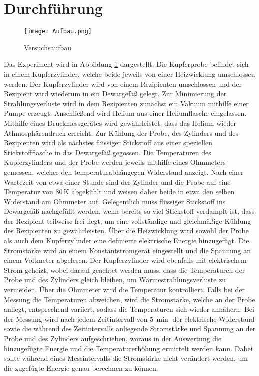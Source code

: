 \section{Durchführung}
\label{sec:Durchführung}
\begin{figure}
  \texttt{[image: Aufbau.png]}
  \caption{Versuchsaufbau\cite{V47}}
    \label{fig:Aufbau}
\end{figure}
Das Experiment wird in Abbildung \ref{fig:Aufbau} dargestellt.
Die Kupferprobe befindet sich in einem Kupferzylinder, welche beide
jeweils von einer Heizwicklung umschlossen werden.
Der Kupferzylinder wird von einem Rezipienten umschlossen
und der Rezipient wird wiederum in ein Dewargefäß gelegt.
Zur Minimierung der Strahlungsverluste wird in dem
Rezipienten zunächst ein Vakuum mithilfe einer Pumpe erzeugt.
Anschließend wird Helium aus einer Heliumflasche eingelassen.
Mithilfe eines Druckmessgerätes wird gewährleistet, dass das Helium wieder Athmosphärendruck erreicht.
Zur Kühlung der Probe, des Zylinders und des Rezipienten wird als nächstes flüssiger Stickstoff
aus einer speziellen Stickstoffflasche in das Dewargefäß gegossen.
Die Temperaturen des Kupferzylinders und der Probe werden jeweils mithilfe eines Ohmmeters gemessen,
welcher den temperaturabhängegen Widerstand anzeigt.
Nach einer Wartezeit von etwa einer Stunde sind der Zylinder und die Probe auf eine Temperatur von
$80 \, \si{\kelvin}$ abgekühlt und weisen daher beide in etwa den selben Widerstand am Ohmmeter auf.
Gelegentlich muss flüssiger Stickstoff ins Dewargefäß nachgefüllt werden, wenn bereits
so viel Stickstoff verdampft ist, dass der Rezipient teilweise frei liegt,
um eine vollständige und gleichmäßige Kühlung des Rezipienten zu gewährleisten.
Über die Heizwicklung wird sowohl der Probe als auch dem Kupferzylinder eine definierte elektrische Energie hinzugefügt.
Die Stromstärke wird an einem Konstantstromgerät eingestellt und die Spannung an einem Voltmeter abgelesen.
Der Kupferzylinder wird ebenfalls mit elektrischem Strom geheizt, wobei darauf geachtet werden  muss,
dass die Temperaturen der Probe und des Zylinders gleich bleiben, um Wärmestrahlungsverluste zu vermeiden.
Über die Ohmmeter wird die Temperatur kontrolliert.
Falls bei der Messung die Temperaturen abweichen, wird die Stromstärke, welche an der Probe anliegt,
entsprechend variiert, sodass die Temperaturen sich wieder annähern.
Bei der Messung wird nach jedem Zeitintervall von $5 \, \si{\min}$ der elektrische Widerstand
sowie die während des Zeitintervalls anliegende Stromstärke und Spannung an der Probe und des Zylinders aufgeschrieben,
woraus in der Auswertung die hinzugefügte Energie und die Temperaturerhöhung ermittelt werden kann.
Dabei sollte während eines Messintervalls die Stromstärke nicht verändert werden,
um die zugefügte Energie genau berechnen zu können.
